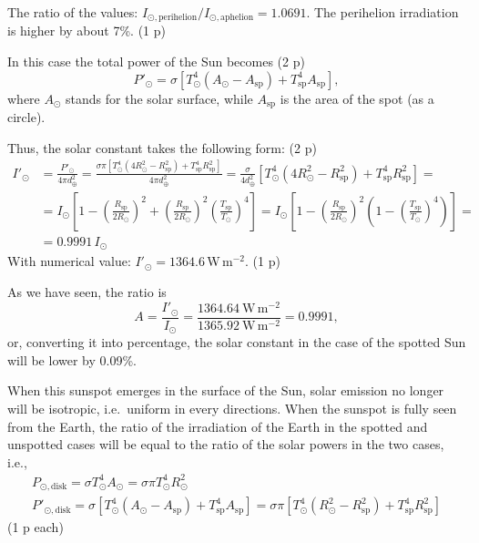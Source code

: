 \begin{description}
  The ratio of the values:
  $I_{\odot,\mathrm{perihelion}}/I_{\odot,\mathrm{aphelion}} = 1.0691$. The
  perihelion irradiation is higher by about 7\%. \hfill(1 p)
\item[(c)] In this case the total power of the Sun becomes \hfill(2 p)
  \begin{equation*}
  P'_\odot = \sigma\left[T_\odot^4(A_\odot - A_{\mathrm{sp}})
    + T_{\mathrm{sp}}^4 A_{\mathrm{sp}}\right], \tag{7.5}
  \end{equation*}
  where $A_\odot$ stands for the solar surface, while $A_{\mathrm{sp}}$ is the
  area of the spot (as a circle).

  Thus, the solar constant takes the following form: \hfill(2 p)
  \begin{align*}
  I'_\odot &= \frac{P'_\odot}{4\pi d_\oplus^2}
    = \frac{\sigma\pi\left[T_\odot^4(4R_\odot^2 - R_{\mathrm{sp}}^2)
      + T_{\mathrm{sp}}^4 R_{\mathrm{sp}}^2\right]}{4\pi d_\oplus^2}
    = \frac{\sigma}{4 d_\oplus^2}\left[T_\odot^4(4R_\odot^2 - R_{\mathrm{sp}}^2)
      + T_{\mathrm{sp}}^4 R_{\mathrm{sp}}^2\right] = \tag{7.6}\\
  &= I_\odot\left[1 - \left(\frac{R_{\mathrm{sp}}}{2R_\odot}\right)^2
    + \left(\frac{R_{\mathrm{sp}}}{2R_\odot}\right)^2
      \left(\frac{T_{\mathrm{sp}}}{T_\odot}\right)^4\right]
   = I_\odot\left[1 - \left(\frac{R_{\mathrm{sp}}}{2R_\odot}\right)^2
      \left(1 - \left(\frac{T_{\mathrm{sp}}}{T_\odot}\right)^4\right)\right] =\\
  &= 0.9991\,I_\odot \tag*{(2 p)}
  \end{align*}
  With numerical value: $I'_\odot = 1364.6$\,W\,m$^{-2}$. \hfill(1 p)
\item[(d)] As we have seen, the ratio is
  \[
  A = \frac{I'_\odot}{I_\odot}
    = \frac{1364.64~\mathrm{W\,m^{-2}}}{1365.92~\mathrm{W\,m^{-2}}} = 0.9991,
  \]
  or, converting it into percentage, the solar constant in the case of the
  spotted Sun will be lower by 0.09\%.

  When this sunspot emerges in the surface of the Sun, solar emission no
  longer will be isotropic, i.e.\ uniform in every directions. When the
  sunspot is fully seen from the Earth, the ratio of the irradiation of the
  Earth in the spotted and unspotted cases will be equal to the ratio of the
  solar powers in the two cases, i.e.,
  \begin{gather*}
  P_{\odot,\mathrm{disk}} = \sigma T_\odot^4 A_\odot
    = \sigma\pi T_\odot^4 R_\odot^2 \tag{7.7}\\
  P'_{\odot,\mathrm{disk}} = \sigma\left[T_\odot^4(A_\odot - A_{\mathrm{sp}})
    + T_{\mathrm{sp}}^4 A_{\mathrm{sp}}\right]
    = \sigma\pi\left[T_\odot^4(R_\odot^2 - R_{\mathrm{sp}}^2)
    + T_{\mathrm{sp}}^4 R_{\mathrm{sp}}^2\right] \tag{7.8}
  \end{gather*}
  \hfill(1 p each)


\end{description}

